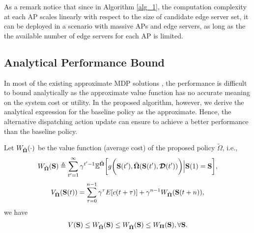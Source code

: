 As a remark notice that since in Algorithm \ref{alg_1}, the computation complexity at each AP scales linearly with respect to {the size of candidate edge server set}, it can be deployed in a scenario with massive APs and edge servers, as long as the {the available number of edge servers for each AP} is limited.

\subsection{Analytical Performance Bound}
\label{subsec:analysis}
In most of the existing approximate MDP solutions \cite{mdp-bound1,mdp-bound2,mdp-bound3}, the performance is difficult to bound analytically as the approximate value function has no accurate meaning on the system cost or utility.
In the proposed algorithm, however, we derive the analytical expression for the baseline policy as the approximate.
Hence, the alternative dispatching action update can ensure to achieve a better performance than the baseline policy.
\begin{lemma}
    \label{lemma:bound}
    Let $W_{\tilde{\boldsymbol{\Omega}}}(\cdot)$ be the value function (average cost) of the proposed policy $\tilde{\Omega}$, i.e.,
    {\small
    \begin{align}
        W_{\tilde{\boldsymbol{\Omega}}}(\mathbf{S}) \triangleq
        \sum_{t'=1}^{\infty} \gamma^{t'-1} \mathbb{E}^{ \tilde{\boldsymbol{\Omega}} } \bigg[
            g\bigg(\mathbf{S}(t'), \tilde{\boldsymbol{\Omega}}(\mathbf{S}(t'),\boldsymbol{\mathcal{D}}(t'))\bigg) \Big| \mathbf{S}(1)=\mathbf{S}
        \bigg],
    \end{align}
    }
    {\small
    \begin{align}
        V_{\hat{\boldsymbol{\Pi}}}(\mathbf{S}(t)) = \sum_{\tau=0}^{n-1} \gamma^{\tau} E[c(t+\tau)] + \gamma^{n-1} W_{\hat{\boldsymbol{\Pi}}}(\mathbf{S}(t+n)),
    \end{align}
    }%
    we have
    {\small
    \begin{align}
        V(\mathbf{S})
        \leq W_{\tilde{\boldsymbol{\Omega}}}(\mathbf{S})
        \leq W_{\hat{\boldsymbol{\Pi}}}(\mathbf{S})
        \leq W_{\boldsymbol{\Pi}}(\mathbf{S}),
        \forall \mathbf{S}.
    \end{align}
    }%
\end{lemma}
